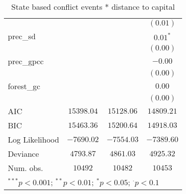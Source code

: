 \begin{sidewaystable}
\begin{center}
{\begin{tabular}{l c c c}
                     &               &                & $(0.01)$       \\
prec\_sd             &               &                & $0.01^{*}$     \\
                     &               &                & $(0.00)$       \\
prec\_gpcc           &               &                & $-0.00$        \\
                     &               &                & $(0.00)$       \\
forest\_gc           &               &                & $0.00$         \\
                     &               &                & $(0.00)$       \\
\hline
AIC                  & $15398.04$    & $15128.06$     & $14809.21$     \\
BIC                  & $15463.36$    & $15200.64$     & $14918.03$     \\
Log Likelihood       & $-7690.02$    & $-7554.03$     & $-7389.60$     \\
Deviance             & $4793.87$     & $4861.03$      & $4925.32$      \\
Num. obs.            & $10492$       & $10482$        & $10453$        \\
\hline
\multicolumn{4}{l}{\scriptsize{$^{***}p<0.001$; $^{**}p<0.01$; $^{*}p<0.05$; $^{\cdot}p<0.1$}}
\end{tabular}
}
\caption{State based conflict events *
		  distance to capital}
\label{interaction_sqrtState_based}
\end{center}
\end{sidewaystable}
